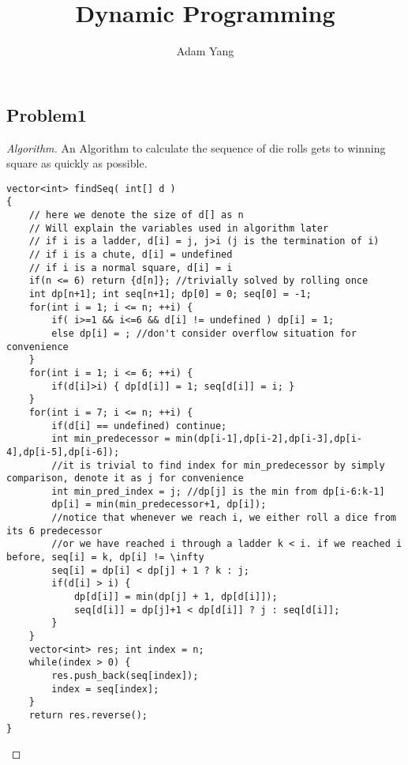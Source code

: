 \documentclass[openany]{article}
\begin{document}
\title{Dynamic Programming}
\author{Adam Yang}
\maketitle




\subsection*{Problem1}


\begin{proof}[Algorithm]{}
		\renewcommand{\qedsymbol}{}
		An Algorithm to calculate the sequence of die rolls gets to winning square as quickly as possible.
		\begin{lstlisting}[basicstyle=\fontsize{8}{9}\selectfont\ttfamily]
vector<int> findSeq( int[] d )
{
    // here we denote the size of d[] as n
    // Will explain the variables used in algorithm later
    // if i is a ladder, d[i] = j, j>i (j is the termination of i)
    // if i is a chute, d[i] = undefined
    // if i is a normal square, d[i] = i
    if(n <= 6) return {d[n]}; //trivially solved by rolling once
    int dp[n+1]; int seq[n+1]; dp[0] = 0; seq[0] = -1;
    for(int i = 1; i <= n; ++i) {
        if( i>=1 && i<=6 && d[i] != undefined ) dp[i] = 1;
        else dp[i] = ; //don't consider overflow situation for convenience
    }
    for(int i = 1; i <= 6; ++i) {
        if(d[i]>i) { dp[d[i]] = 1; seq[d[i]] = i; }
    }
    for(int i = 7; i <= n; ++i) {
        if(d[i] == undefined) continue;
        int min_predecessor = min(dp[i-1],dp[i-2],dp[i-3],dp[i-4],dp[i-5],dp[i-6]);
        //it is trivial to find index for min_predecessor by simply comparison, denote it as j for convenience
        int min_pred_index = j; //dp[j] is the min from dp[i-6:k-1]
        dp[i] = min(min_predecessor+1, dp[i]);
        //notice that whenever we reach i, we either roll a dice from its 6 predecessor
        //or we have reached i through a ladder k < i. if we reached i before, seq[i] = k, dp[i] != \infty
        seq[i] = dp[i] < dp[j] + 1 ? k : j;
        if(d[i] > i) {
            dp[d[i]] = min(dp[j] + 1, dp[d[i]]);
            seq[d[i]] = dp[j]+1 < dp[d[i]] ? j : seq[d[i]];
        }
    }
    vector<int> res; int index = n;
    while(index > 0) {
        res.push_back(seq[index]);
        index = seq[index];
    }
    return res.reverse();
}
		\end{lstlisting} 
\end{proof}
\end{document}
